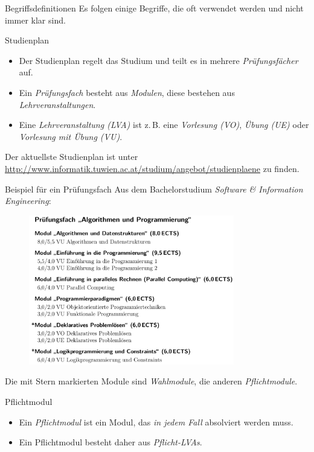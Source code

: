 \documentclass{beamer}
\begin{document}
\begin{frame}{Begriffsdefinitionen}
    Es folgen einige Begriffe, die oft verwendet werden und nicht immer klar
    sind.
\end{frame}

\begin{frame}{Studienplan}
    \begin{itemize}
        \item Der Studienplan regelt das Studium und teilt es in mehrere
              \textit{Prüfungsfächer} auf.
        \item Ein \textit{Prüfungsfach} besteht aus \textit{Modulen}, diese
              bestehen aus \textit{Lehrveranstaltungen}.
        \item Eine \textit{Lehrveranstaltung (LVA)} ist z.\,B. eine
              \textit{Vorlesung (VO)}, \textit{Übung (UE)} oder
              \textit{Vorlesung mit Übung (VU)}.
    \end{itemize}
    Der aktuellste Studienplan ist unter
    \url{http://www.informatik.tuwien.ac.at/studium/angebot/studienplaene}
    zu finden.
\end{frame}

\begin{frame}{Beispiel für ein Prüfungsfach}
    Aus dem Bachelorstudium \textit{Software \& Information Engineering}: \\
    \begin{figure}[htp]
        \centering
        \includegraphics[width=0.8\textwidth]{pruefungsfach.png}
    \end{figure}
    \small Die mit Stern markierten Module sind \textit{Wahlmodule}, die anderen
          \textit{Pflichtmodule}.
\end{frame}

\begin{frame}{Pflichtmodul}
    \begin{itemize}
        \item Ein \textit{Pflichtmodul} ist ein Modul, das
              \textit{in jedem Fall} absolviert werden muss.
        \item Ein Pflichtmodul besteht daher aus \textit{Pflicht-LVAs}.
    \end{itemize}
\end{frame}
\end{document}
